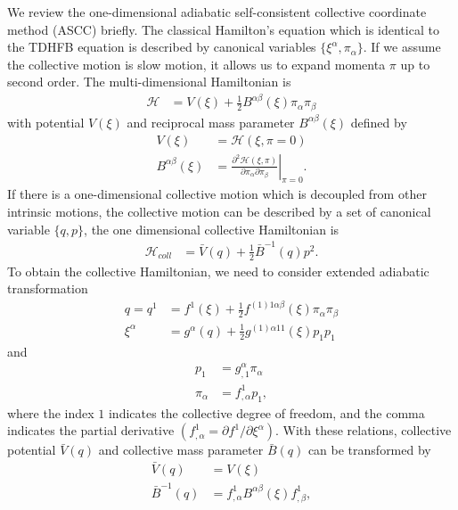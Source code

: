 \documentclass[%
superscriptaddress,
showpacs,
nofootinbib,
amsmath,amssymb,
aps,
prc,
twocolumn,
floatfix ]%
{revtex4-1}
\begin{document}
We review the one-dimensional adiabatic self-consistent collective coordinate method (ASCC) briefly. The classical Hamilton's equation which is identical to the TDHFB equation is described by canonical variables $\{\xi^{\alpha},\pi_{\alpha}\}$. If we assume the collective motion is slow motion, it allows us to expand momenta $\pi$ up to second order. The multi-dimensional Hamiltonian is
\begin{align}
  \mathcal{H} &= V(\xi) + \frac{1}{2}B^{\alpha\beta}(\xi)\pi_{\alpha}\pi_{\beta}
\end{align}
with potential $V(\xi)$ and reciprocal mass parameter $B^{\alpha\beta}(\xi)$ defined by
\begin{align}
  V(\xi) &= \mathcal{H}(\xi,\pi=0) \\
  B^{\alpha\beta}(\xi) &= \left. \frac{\partial^2\mathcal{H}(\xi,\pi)}{\partial\pi_{\alpha}\partial\pi_{\beta}} \right|_{\pi=0}.
\end{align}
 If there is a one-dimensional collective motion which is decoupled from other intrinsic motions, the collective motion can be described by a set of canonical variable $\{q,p\}$, the one dimensional collective Hamiltonian is
\begin{align}
  \mathcal{H}_{coll} &= \bar{V}(q) + \frac{1}{2}\bar{B}^{-1}(q)p^2.
  \label{coll}
\end{align}
To obtain the collective Hamiltonian, we need to consider extended adiabatic transformation
\begin{align}
  q = q^1 &= f^1(\xi) + \frac{1}{2}f^{(1)1\alpha\beta}(\xi)\pi_{\alpha}\pi_{\beta}  \label{point}\\
 \xi^{\alpha} &= g^{\alpha}(q) + \frac{1}{2}g^{(1)\alpha 1 1}(\xi)p_{1}p_{1}
\end{align}
and
\begin{align}
  p_1 &= g_{,1}^{\alpha}\pi_{\alpha} \\
 \pi_{\alpha} &= f^1_{,\alpha}p_1 ,
  \label{momenta}
\end{align}
where the index $1$ indicates the collective degree of freedom, and the comma indicates the partial derivative $(f^1_{,\alpha}=\partial f^1/\partial \xi^{\alpha})$. 
With these relations, collective potential $\bar{V}(q)$ and collective mass parameter $\bar{B}(q)$ can be transformed by
\begin{align}
  \bar{V}(q) &= V(\xi) \\
  \bar{B}^{-1}(q) &= f^1_{,\alpha}B^{\alpha\beta}(\xi)f^1_{,\beta} ,
  \label{coll_mass}
\end{align}
\end{document}

